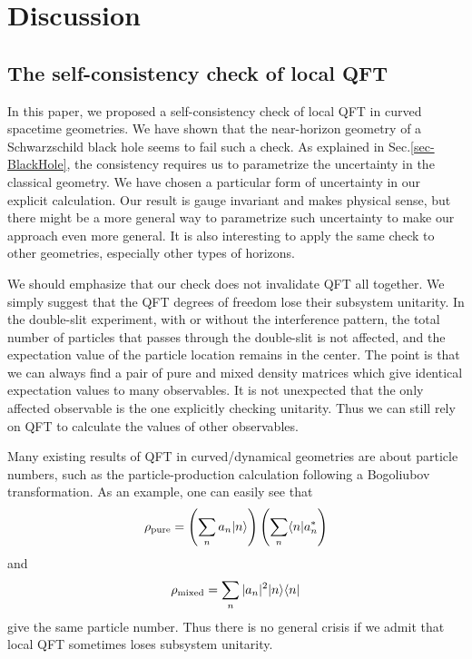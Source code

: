 \documentclass[aps,showpacs,onecolumn,floats,prd,superscriptaddress,nofootinbib]{revtex4-1}
\begin{document}
\section{Discussion}
\label{sec-dis}

\subsection{The self-consistency check of local QFT}

In this paper, we proposed a self-consistency check of local QFT in curved spacetime geometries.
We have shown that the near-horizon geometry of a Schwarzschild black hole seems to fail such a check.
As explained in Sec.\ref{sec-BlackHole}, the consistency requires us to parametrize the uncertainty in the classical geometry.
We have chosen a particular form of uncertainty in our explicit calculation.
Our result is gauge invariant and makes physical sense, but there might be a more general way to parametrize such uncertainty to make our approach even more general.
It is also interesting to apply the same check to other geometries, especially other types of horizons.

We should emphasize that our check does not invalidate QFT all together.
We simply suggest that the QFT degrees of freedom lose their subsystem unitarity.
In the double-slit experiment, with or without the interference pattern, the total number of particles that passes through the double-slit is not affected, and the expectation value of the particle location remains in the center.
The point is that we can always find a pair of pure and mixed density matrices which give identical expectation values to many observables.
It is not unexpected that the only affected observable is the one explicitly checking unitarity.
Thus we can still rely on QFT to calculate the values of other observables.

Many existing results of QFT in curved/dynamical geometries are about particle numbers, such as the particle-production calculation following a Bogoliubov transformation. 
As an example, one can easily see that
\begin{equation}
\rho_{\rm pure} = \left(\sum_n a_n|n\rangle\right)
\left(\sum_n \langle n| a_n^*\right)
\end{equation}
and
\begin{equation}
\rho_{\rm mixed} = \sum_n |a_n|^2 |n\rangle\langle n|
\end{equation}
give the same particle number. 
Thus there is no general crisis if we admit that local QFT sometimes loses subsystem unitarity. 
\end{document}

